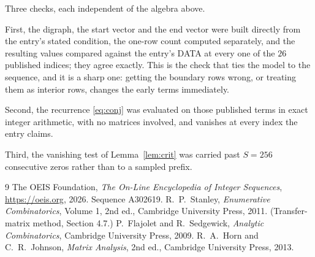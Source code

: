 \documentclass[11pt,a4paper]{article}
\theoremstyle{plain}
\theoremstyle{definition}
\begin{document}
Three checks, each independent of the algebra above.

First, the digraph, the start vector and the end vector were built directly from the
entry's stated condition, the one-row count computed separately, and the resulting values
compared against the entry's DATA at every one of the $26$ published indices; they
agree exactly. This is the check that ties the model to the sequence, and it is a sharp one:
getting the boundary rows wrong, or treating them as interior rows, changes the early terms
immediately.

Second, the recurrence \eqref{eq:conj} was evaluated on those published terms in exact
integer arithmetic, with no matrices involved, and vanishes at every index the entry claims.

Third, the vanishing test of Lemma~\ref{lem:crit} was carried past $S=256$ consecutive
zeros rather than to a sampled prefix.

\begin{thebibliography}{9}
 The OEIS Foundation, \emph{The On-Line Encyclopedia of Integer
Sequences}, \url{https://oeis.org}, 2026. Sequence A302619.
 R.~P.~Stanley, \emph{Enumerative Combinatorics}, Volume 1, 2nd ed.,
Cambridge University Press, 2011. (Transfer-matrix method, Section 4.7.)
 P.~Flajolet and R.~Sedgewick, \emph{Analytic Combinatorics}, Cambridge
University Press, 2009.
 R.~A.~Horn and C.~R.~Johnson, \emph{Matrix Analysis}, 2nd ed., Cambridge
University Press, 2013.
\end{thebibliography}
\end{document}
